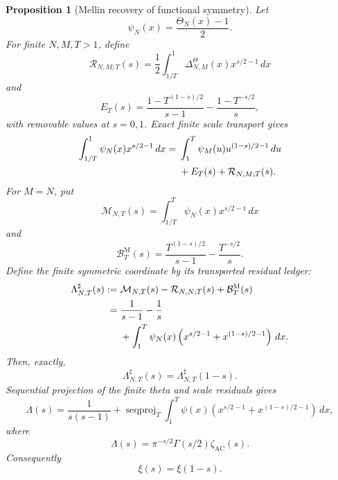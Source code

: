 \documentclass[11pt,a4paper]{article}
\newtheorem{proposition}[theorem]{Proposition}
\theoremstyle{definition}
\newcommand{\Boundary}{\mathcal{B}}
\newcommand{\SeqProj}{\operatorname{seqproj}}
\begin{document}
\begin{proposition}[Mellin recovery of functional symmetry]
\label{prop:mellin-functional-symmetry}
Let
\[
  \psi_N(x)=\frac{\Theta_N(x)-1}{2}.
\]
For finite $N,M,T>1$, define
\[
  \mathcal R_{N,M;T}(s)
  =
  \frac12\int_{1/T}^{1}
  \Delta_{N,M}^{\Theta}(x)x^{s/2-1}\,dx
\]
and
\[
  E_T(s)
  =
  \frac{1-T^{(1-s)/2}}{s-1}
  -\frac{1-T^{-s/2}}s,
\]
with removable values at $s=0,1$. Exact finite scale transport gives
\begin{align}
\int_{1/T}^{1}\psi_N(x)x^{s/2-1}\,dx
={}&
\int_1^T\psi_M(u)u^{(1-s)/2-1}\,du\notag\\
&+E_T(s)+\mathcal R_{N,M;T}(s).
\label{eq:finite-mellin-scale-transport}
\end{align}
For $M=N$, put
\[
  \mathcal M_{N,T}(s)
  =
  \int_{1/T}^{T}\psi_N(x)x^{s/2-1}\,dx
\]
and
\[
  \Boundary_T^{\mathrm M}(s)
  =
  \frac{T^{(1-s)/2}}{s-1}
  -\frac{T^{-s/2}}s.
\]
Define the finite symmetric coordinate by its transported residual ledger:
\begin{align}
  \Lambda^\sharp_{N,T}(s)
  :={}&
  \mathcal M_{N,T}(s)
  -\mathcal R_{N,N;T}(s)
  +\Boundary_T^{\mathrm M}(s)\notag\\
  ={}&
  \frac1{s-1}-\frac1s\notag\\
  &+\int_1^T\psi_N(x)
  \left(x^{s/2-1}+x^{(1-s)/2-1}\right)\,dx.
\label{eq:finite-mellin-symmetric-coordinate}
\end{align}
Then, exactly,
\[
  \Lambda^\sharp_{N,T}(s)
  =\Lambda^\sharp_{N,T}(1-s).
\]
Sequential projection of the finite theta and scale residuals gives
\begin{equation}
\label{eq:lambda-recovered}
  \Lambda(s)
  =
  \frac1{s(s-1)}
  +\SeqProj_T
  \int_1^T\psi(x)
  \left(x^{s/2-1}+x^{(1-s)/2-1}\right)\,dx,
\end{equation}
where
\[
  \Lambda(s)=\pi^{-s/2}\Gamma(s/2)\zeta_{\mathrm{AC}}(s).
\]
Consequently
\begin{equation}
\label{eq:functional-symmetry-recovered}
  \xi(s)=\xi(1-s).
\end{equation}
\end{proposition}
\end{document}
